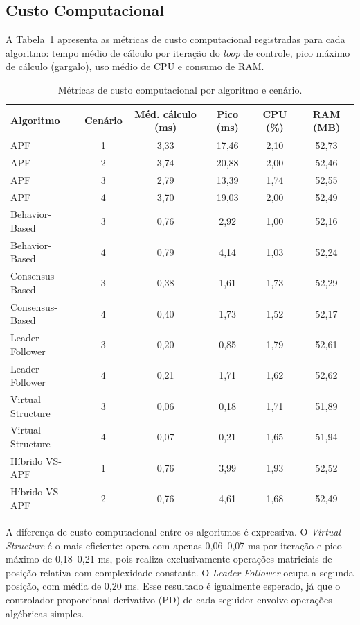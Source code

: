 \subsection{Custo Computacional}

A Tabela~\ref{tab:custo} apresenta as métricas de custo computacional registradas para cada algoritmo: tempo médio de cálculo por iteração do \textit{loop} de controle, pico máximo de cálculo (gargalo), uso médio de CPU e consumo de RAM.

\begin{table}[ht]
\centering
\caption{Métricas de custo computacional por algoritmo e cenário.}
\label{tab:custo}
\renewcommand{\arraystretch}{1.15}
\begin{tabular}{|p{3.2cm}|c|c|c|c|c|}
\hline
\textbf{Algoritmo} & \textbf{Cenário} & \textbf{Méd. cálculo (ms)} & \textbf{Pico (ms)} & \textbf{CPU (\%)} & \textbf{RAM (MB)} \\ \hline
APF             & 1 & 3,33 & 17,46 & 2,10 & 52,73 \\ \hline
APF             & 2 & 3,74 & 20,88 & 2,00 & 52,46 \\ \hline
APF             & 3 & 2,79 & 13,39 & 1,74 & 52,55 \\ \hline
APF             & 4 & 3,70 & 19,03 & 2,00 & 52,49 \\ \hline
Behavior-Based  & 3 & 0,76 & 2,92  & 1,00 & 52,16 \\ \hline
Behavior-Based  & 4 & 0,79 & 4,14  & 1,03 & 52,24 \\ \hline
Consensus-Based & 3 & 0,38 & 1,61  & 1,73 & 52,29 \\ \hline
Consensus-Based & 4 & 0,40 & 1,73  & 1,52 & 52,17 \\ \hline
Leader-Follower & 3 & 0,20 & 0,85  & 1,79 & 52,61 \\ \hline
Leader-Follower & 4 & 0,21 & 1,71  & 1,62 & 52,62 \\ \hline
Virtual Structure & 3 & 0,06 & 0,18 & 1,71 & 51,89 \\ \hline
Virtual Structure & 4 & 0,07 & 0,21 & 1,65 & 51,94 \\ \hline
Híbrido VS-APF  & 1 & 0,76 & 3,99  & 1,93 & 52,52 \\ \hline
Híbrido VS-APF  & 2 & 0,76 & 4,61  & 1,68 & 52,49 \\ \hline
\end{tabular}
\end{table}

A diferença de custo computacional entre os algoritmos é expressiva. O \textit{Virtual Structure} é o mais eficiente: opera com apenas 0,06--0,07 ms por iteração e pico máximo de 0,18--0,21 ms, pois realiza exclusivamente operações matriciais de posição relativa com complexidade constante. O \textit{Leader-Follower} ocupa a segunda posição, com média de 0,20 ms. Esse resultado é igualmente esperado, já que o controlador proporcional-derivativo (PD) de cada seguidor envolve operações algébricas simples.

